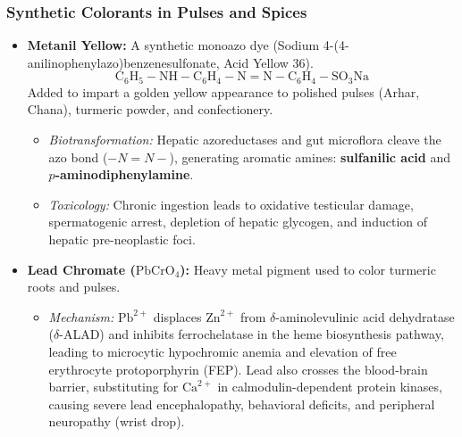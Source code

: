 \documentclass[11pt,a4paper,oneside]{article}
\begin{document}
\subsubsection{Synthetic Colorants in Pulses and Spices}
\begin{itemize}[leftmargin=*]
    \item \textbf{Metanil Yellow:} A synthetic monoazo dye (Sodium 4-(4-anilinophenylazo)benzenesulfonate, Acid Yellow 36).
    $$\mathrm{C_6H_5-NH-C_6H_4-N=N-C_6H_4-SO_3Na}$$
    Added to impart a golden yellow appearance to polished pulses (Arhar, Chana), turmeric powder, and confectionery.
    \begin{itemize}
        \item \textit{Biotransformation:} Hepatic azoreductases and gut microflora cleave the azo bond ($-N=N-$), generating aromatic amines: \textbf{sulfanilic acid} and \textbf{$p$-aminodiphenylamine}.
        \item \textit{Toxicology:} Chronic ingestion leads to oxidative testicular damage, spermatogenic arrest, depletion of hepatic glycogen, and induction of hepatic pre-neoplastic foci.
    \end{itemize}
    \item \textbf{Lead Chromate ($\mathrm{PbCrO_4}$):} Heavy metal pigment used to color turmeric roots and pulses.
    \begin{itemize}
        \item \textit{Mechanism:} $\mathrm{Pb}^{2+}$ displaces $\mathrm{Zn}^{2+}$ from $\delta$-aminolevulinic acid dehydratase ($\delta$-ALAD) and inhibits ferrochelatase in the heme biosynthesis pathway, leading to microcytic hypochromic anemia and elevation of free erythrocyte protoporphyrin (FEP). Lead also crosses the blood-brain barrier, substituting for $\mathrm{Ca}^{2+}$ in calmodulin-dependent protein kinases, causing severe lead encephalopathy, behavioral deficits, and peripheral neuropathy (wrist drop).
    \end{itemize}
\end{itemize}
\end{document}
